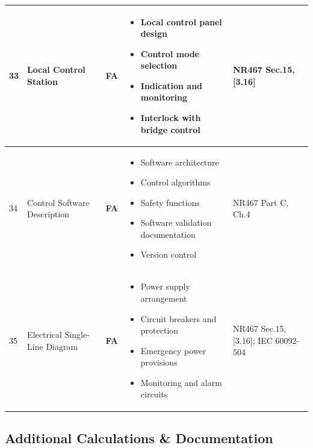 \documentclass[11pt,a4paper]{report}
\newcommand{\fa}{\textbf{\textcolor{warningred}{FA}}}
\begin{document}
\begin{longtable}{|p{0.5cm}|p{5cm}|p{1.5cm}|p{5.5cm}|p{2cm}|}
33 & Local Control Station & \fa{} & 
\begin{itemize}[leftmargin=*,nosep]
\item Local control panel design
\item Control mode selection
\item Indication and monitoring
\item Interlock with bridge control
\end{itemize} & NR467 Sec.15, [3.16] \\
\hline

34 & Control Software Description & \fa{} & 
\begin{itemize}[leftmargin=*,nosep]
\item Software architecture
\item Control algorithms
\item Safety functions
\item Software validation documentation
\item Version control
\end{itemize} & NR467 Part C, Ch.4 \\
\hline

35 & Electrical Single-Line Diagram & \fa{} & 
\begin{itemize}[leftmargin=*,nosep]
\item Power supply arrangement
\item Circuit breakers and protection
\item Emergency power provisions
\item Monitoring and alarm circuits
\end{itemize} & NR467 Sec.15, [3.16]; IEC 60092-504 \\
\hline

\end{longtable}

\subsection{Additional Calculations \& Documentation}
\end{document}
